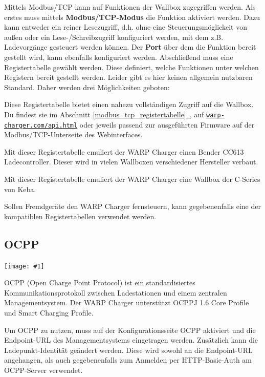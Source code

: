 \documentclass[a4paper,10pt]{article}
\newcommand{\gfx}[1]{\texttt{[image: \#1]}}
\newcommand*{\fullref}[1]{Abschnitt \hyperref[{#1}]{\ref*{#1}~\nameref*{#1}}}
\newcommand\rurl[2]{%
  \href{#1}{\nolinkurl{#2}}%
}
\begin{document}
\begin{multicols*}{2}
    Mittels Modbus/TCP kann auf Funktionen der Wallbox zugegriffen werden.
    Als erstes muss mittels \textbf{Modbus/TCP-Modus} die Funktion aktiviert
    werden. Dazu kann entweder ein reiner Lesezugriff, d.h. ohne eine
    Steuerungsmöglickeit von außen oder ein Lese-/Schreibzugriff
    konfiguriert werden, mit dem z.B. Ladevorgänge gesteuert werden können.
    Der \textbf{Port} über dem die Funktion bereit gestellt
    wird, kann ebenfalls konfiguriert werden. Abschließend muss eine
    Registertabelle gewählt werden. Diese definiert, welche Funktionen unter
    welchen Registern bereit gestellt werden. Leider gibt es hier keinen
    allgemein nutzbaren Standard. Daher werden drei Möglichkeiten geboten:

    \begin{description}[labelindent=0.5cm, leftmargin=0.5cm]
        \item[WARP Charger] Diese Registertabelle bietet einen nahezu vollständigen Zugriff auf die Wallbox.
                Du findest sie im \fullref{modbus_tcp_registertabelle}, auf \rurl{https://warp-charger.com/api.html}{warp-charger.com/api.html} oder
                jeweils passend zur ausgeführten Firmware auf der Modbus/TCP-Unterseite des Webinterfaces.
        \item[Kompatibilität zu Bender CC613] Mit dieser Registertabelle emuliert der WARP Charger einen Bender CC613 Ladecontroller. Dieser wird in vielen Wallboxen verschiedener Hersteller verbaut.
        \item[Kompatibilität zu Keba C Series] Mit dieser Registertabelle emuliert der WARP Charger eine Wallbox der C-Series von Keba.
    \end{description}

    Sollen Fremdgeräte den WARP Charger fernsteuern, kann gegebenenfalls eine der
    kompatiblen Registertabellen verwendet werden.

    \vspace*{-0.1cm}

    \subsection{OCPP}
    \gfx{./img_warp2/resized/web_ocpp}

    OCPP (Open Charge Point Protocol) ist ein standardisiertes Kommunikationsprotokoll zwischen
    Ladestationen und einem zentralen Managementsystem. Der WARP Charger
    unterstützt OCPPJ 1.6 Core Profile und Smart Charging Profile.

    Um OCPP zu nutzen, muss auf der Konfigurationsseite OCPP aktiviert und die
    Endpoint-URL des Managementsystems eingetragen werden. Zusätzlich kann die Ladepunkt-Identität
    geändert werden. Diese wird sowohl an die Endpoint-URL angehangen, als auch gegebenenfalls zum
    Anmelden per HTTP-Basic-Auth am OCPP-Server verwendet.


\end{multicols*}
\end{document}
